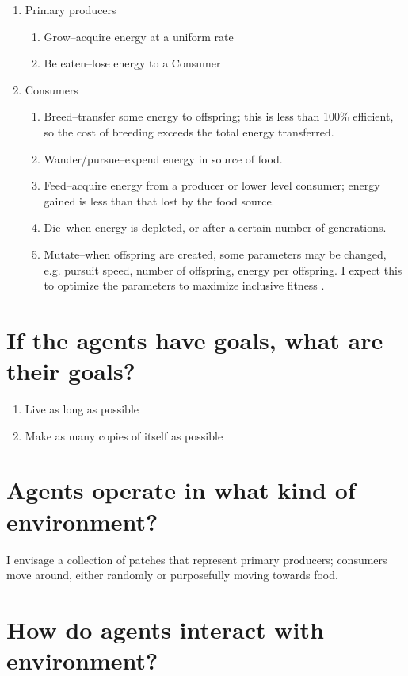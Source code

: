 \documentclass[]{article}
\begin{document}
\begin{enumerate}
	\item Primary producers
	\begin{enumerate}
		\item Grow--acquire energy at a uniform rate
		\item Be eaten--lose energy to a Consumer
	\end{enumerate}	
	\item Consumers
	\begin{enumerate}
		\item Breed--transfer some energy to offspring; this is less than 100\% efficient, so the cost of breeding exceeds the total energy transferred. 
		\item Wander/pursue--expend energy in source of food.
		\item Feed--acquire energy from a producer or lower level consumer; energy gained is less than that lost by the food source.
		\item Die--when energy is depleted, or after a certain number of generations.
		\item Mutate--when offspring are created, some parameters may be changed, e.g. pursuit speed, number of offspring, energy per offspring. I expect this to optimize the parameters to maximize inclusive fitness \cite{wiki:inclusive}.
	\end{enumerate}
\end{enumerate}


\section{If the agents have goals, what are their goals?}

\begin{enumerate}
	\item Live as long as possible
	\item Make as many copies of itself as possible
\end{enumerate}

\section{Agents operate in what kind of environment?}

I envisage a collection of patches that represent primary producers; consumers move around, either randomly or purposefully moving towards food.   

\section{How do agents interact with environment?}
\end{document}
